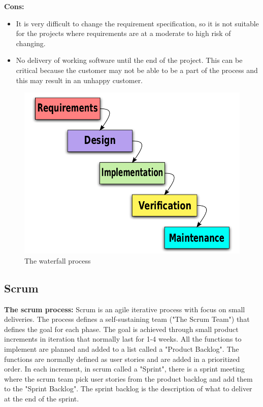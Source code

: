 {\bf Cons: }
\begin{itemize}
	\item It is very difficult to change the requirement specification, so it is not suitable for the projects where requirements are at a moderate to high risk of changing.
	\item No delivery of working software until the end of the project. This can be critical because the customer may not
	be able to be a part of the process and this may result in an unhappy customer.
\end{itemize}

\begin{figure}[!ht]
\centering
\includegraphics[scale=0.3]{pictures/Waterfall_model.png}
\caption{The waterfall process}
\label{overflow}
\end{figure}


\subsection{Scrum}
{\bf The scrum process: } Scrum is an agile iterative process with focus on small deliveries. The process
defines a self-sustaining team ("The Scrum Team") that defines the goal for each phase. The goal 
is achieved through small product increments in iteration that normally last for 1-4 weeks. 
All the functions to implement are planned and added to a list called a "Product Backlog". The
functions are normally defined as user stories and are added in a prioritized order. In each increment, 
in scrum called a "Sprint", there is a sprint meeting where the scrum team pick user stories from the 
product backlog and add them to the "Sprint Backlog". The sprint backlog is the description of what 
to deliver at the end of the sprint.

